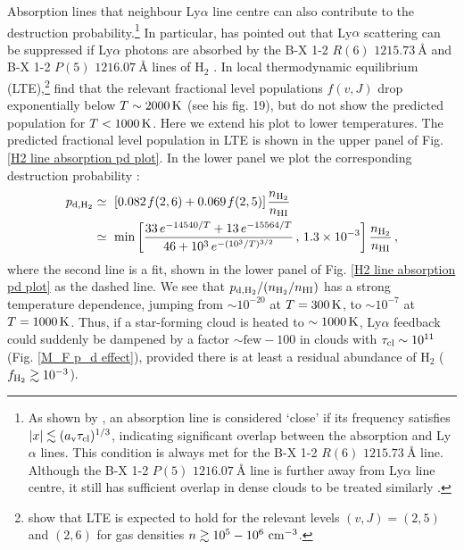 \documentclass[fleqn,usenatbib]{mnras}
\newcommand{\taucl}{\tau_{\rm cl}}
\begin{document}
Absorption lines that neighbour Ly$\alpha$ line centre can also contribute to the destruction probability.\footnote{As shown by \cite{Neufeld1990}, an absorption line is considered `close' if its frequency satisfies $|x| \lesssim (a_{\rm v} \taucl)^{1/3}$, indicating significant overlap between the absorption and Ly$\alpha$ lines. This condition is always met for the B-X 1-2 $R(6)$ $1215.73~ \textrm{Å}$ line. Although the B-X 1-2 $P(5)$ $1216.07~ \textrm{Å}$ line is further away from Ly$\alpha$ line centre, it still has sufficient overlap in dense clouds to be treated similarly \citep[for similar modelling, see][]{Chiu1998}. } In particular, \cite{Neufeld1990} has pointed out that Ly$\alpha$ scattering can be suppressed if Ly$\alpha$ photons are absorbed by the B-X 1-2 $R(6)$ $1215.73~ \textrm{Å}$ and B-X 1-2 $P(5)$ $1216.07~ \textrm{Å}$ lines of H$_2$ \citep[e.g.][]{Shull1978, Lupu2006}. In local thermodynamic equilibrium (LTE),\footnote{\cite{Wolcott2019} show that LTE is expected to hold for the relevant levels $(v,J) = (2,5)$ and $(2,6)$ for gas densities $n \gtrsim 10^5 - 10^6 ~ \rm cm^{-3}$.} \cite{Neufeld1990} find that the relevant fractional level populations $f(v,J)$ drop exponentially below $T \sim 2000\,\rm K$ (see his fig. 19), but do not show the predicted population for $T < 1000\,\rm K$. Here we extend his plot to lower temperatures. The predicted fractional level population in LTE is shown in the upper panel of Fig. \ref{H2 line absorption pd plot}. In the lower panel we plot the corresponding destruction probability \citep[see eqs. 5.7--5.8 in][]{Neufeld1990}:
\begin{align}
    p_{\textrm{d}, \textrm{H}_2} &\simeq~ [0.082 \hspace{1 pt} f(2,6)  + 0.069 \hspace{1 pt} f(2,5) ] \hspace{1 pt} \dfrac{n_{\rm H_2}}{n_{\rm HI}} \label{pd from H2} \\ &\simeq~ \min \left[ \dfrac{33 \, e^{-14540/T} + 13 \, e^{-15564/T}}{46 + 10^3 \, e^{-(10^3/T)^{3/2}}} \, , \, 1.3 \times 10^{-3} \right]  \dfrac{n_{\rm H_2}}{n_{\rm HI}} \nonumber \, ,
\end{align}
where the second line is a fit, shown in the lower panel of Fig. \ref{H2 line absorption pd plot} as the dashed line. We see that $p_{\rm d,H_2}/(n_{\rm H_2}/n_{\rm HI})$ has a strong temperature dependence, jumping from $\sim 10^{-20}$ at $T = 300 \, \rm K$, to $\sim 10^{-7}$ at $T = 1000 \, \rm K$. Thus, if a star-forming cloud is heated to $\sim 1000 \rm \, K$, Ly$\alpha$ feedback could suddenly be dampened by a factor $\sim \textrm{few} - 100$ in clouds with $\taucl \sim 10^{11}$ (Fig. \ref{M_F p_d effect}), provided there is at least a residual abundance of H$_2$ ($f_{\rm H_2} \gtrsim 10^{-3}$). 
\end{document}
